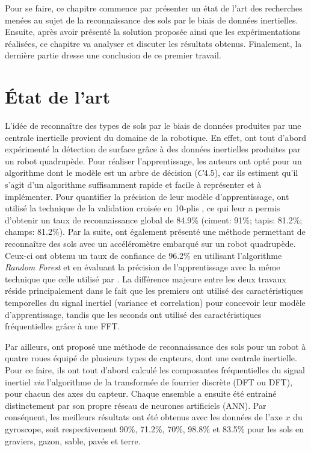 Pour se faire, ce chapitre commence par présenter un état de l'art des recherches menées au sujet de la reconnaissance des sols par le biais de données inertielles. Ensuite, après avoir présenté la solution proposée ainsi que les expérimentations réalisées, ce chapitre va analyser et discuter les résultats obtenus. Finalement, la dernière partie dresse une conclusion de ce premier travail.

\section{État de l'art}
\label{sec:t1-related-work}

L'idée de reconnaître des types de sols par le biais de données produites par une centrale inertielle provient du domaine de la robotique. En effet, \cite{Vail2004} ont tout d'abord expérimenté la détection de surface grâce à des données inertielles produites par un robot quadrupède. Pour réaliser l'apprentissage, les auteurs ont opté pour un algorithme dont le modèle est un arbre de décision ($C4.5$), car ils estiment qu'il s'agit d'un algorithme suffisamment rapide et facile à représenter et à implémenter. Pour quantifier la précision de leur modèle d'apprentissage, \citeauthor{Vail2004} ont utilisé la technique de la validation croisée en 10-plis \citep{Kohavi1995}, ce qui leur a permis d'obtenir un taux de reconnaissance global de 84.9\% (ciment: 91\%; tapis: 81.2\%; champs: 81.2\%). Par la suite, \cite{Kertesz2016} ont également présenté une méthode permettant de reconnaître des sols avec un accéléromètre embarqué sur un robot quadrupède. Ceux-ci ont obtenu un taux de confiance de 96.2\% en utilisant l'algorithme \textit{Random Forest} et en évaluant la précision de l'apprentissage avec la même technique que celle utilisé par \citeauthor{Vail2004}. La différence majeure entre les deux travaux réside principalement dans le fait que les premiers ont utilisé des caractéristiques temporelles du signal inertiel (variance et correlation) pour concevoir leur modèle d'apprentissage, tandis que les seconds ont utilisé des caractéristiques fréquentielles grâce à une \acs{FFT}.

Par ailleurs, \cite{Bibuli2007} ont proposé une méthode de reconnaissance des sols pour un robot à quatre roues équipé de plusieurs types de capteurs, dont une centrale inertielle. Pour ce faire, ils ont tout d'abord calculé les composantes fréquentielles du signal inertiel \textit{via} l'algorithme de la transformée de fourrier discrète (\acl{DFT} ou \acs{DFT}), pour chacun des axes du capteur. Chaque ensemble a ensuite été entrainé distinctement par son propre réseau de neurones artificiels (\acs{ANN}). Par conséquent, les meilleurs résultats ont été obtenus avec les données de l'axe $x$ du gyroscope, soit respectivement 90\%, 71.2\%, 70\%, 98.8\% et 83.5\% pour les sols en graviers, gazon, sable, pavés et terre. 

